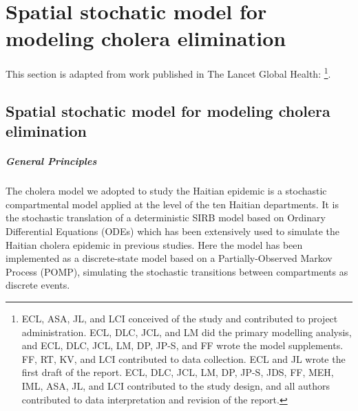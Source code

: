 \chapter{Spatial stochatic model for modeling cholera elimination}
\label{ch:cholera-haiti-ocv}

This section is adapted from work published in The Lancet Global Health:
\footnote{ECL, ASA, JL, and LCI conceived of the study and contributed to project administration. ECL, DLC, JCL, and LM did the primary modelling analysis, and ECL, DLC, JCL, LM, DP, JP-S, and FF wrote the model supplements. FF, RT, KV, and LCI contributed to data collection. ECL and JL wrote the first draft of the report. ECL, DLC, JCL, LM, DP, JP-S, JDS, FF, MEH, IML, ASA, JL, and LCI contributed to the study design, and all authors contributed to data interpretation and revision of the report.}. 



\section{Spatial stochatic model for modeling cholera elimination}
\paragraph{General Principles} The cholera model we adopted to study the Haitian epidemic is a stochastic compartmental model applied at the level of the ten Haitian departments. 
It is the stochastic translation of a deterministic SIRB model based on Ordinary Differential Equations (ODEs) which has been extensively used to simulate the Haitian cholera epidemic in previous studies\cite{Rinaldo:Reassessment20102011:2012, Bertuzzo:PredictionSpatialEvolution:2011,Bertuzzo:ProbabilityExtinctionHaiti:2016,Pasetto:RealtimeForecastingCholera:2018, Lemaitre:RainfallDriverEpidemic:2019}. 
Here the model has been implemented as a discrete-state model based on a Partially-Observed Markov Process (POMP), simulating the stochastic transitions between compartments as discrete events\cite{King:InapparentInfectionsCholera:2008}.

